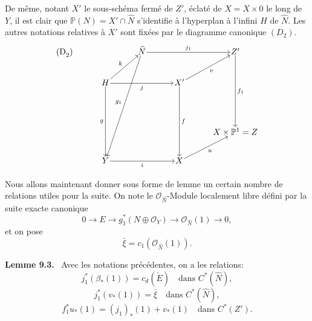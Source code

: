 \documentclass[11pt]{article}
\newenvironment{statement}[1]{\par\medskip\noindent\textbf{#1.}\ }{\par\medskip}
\begin{document}
De même, notant $X'$ le sous-schéma fermé de $Z'$, éclaté de $X=X\times0$ le long de $Y$, il est clair que $\mathbb P(N)=X'\cap\widehat N$ s'identifie à l'hyperplan à l'infini $H$ de $\widehat N$. Les autres notations relatives à $X'$ sont fixées par le diagramme canonique $(D_2)$.
\[
\begin{tikzcd}[column sep=3.2em,row sep=2.4em,cells={nodes={inner sep=1pt}}]
\text{(D}_2\text{)}\arrow[from=1-3,to=5-2,"g_1"']
& & \widehat N \arrow[rr,"j_1"] & & Z' \arrow[ddd,"f_1"] \\
& H \arrow[ur,"k"] \arrow[rr,"j"'] \arrow[ddd,"g"'] & &
X' \arrow[ur,"v"'] \arrow[ddd,"f"] & \\
& & & & \\
& & & & X\times\mathbb P^1=Z \\
& Y \arrow[rr,"i"'] & & X \arrow[ur,"u"'] &
\end{tikzcd}
\]

Nous allons maintenant donner sous forme de lemme un certain nombre de relations utiles pour la suite. On note le $\mathcal O_{\widehat N}$-Module localement libre défini par la suite exacte canonique
\[
0\to E\to g_1^*(N\oplus\mathcal O_Y)\to\mathcal O_{\widehat N}(1)\to0,
\tag{9.3.0}
\]
et on pose
\[
\bar\xi=c_1(\mathcal O_{\widehat N}(1)).
\tag{9.3.1}
\]

\begin{statement}{Lemme 9.3}
Avec les notations précédentes, on a les relations:
\[
j_1^*(\beta_*(1))=c_d(\check E)\quad\text{dans }C^*(\widehat N),
\tag{9.3.2}
\]
\[
j_1^*(v_*(1))=\bar\xi\quad\text{dans }C^*(\widehat N),
\tag{9.3.3}
\]
\[
f_1^*u_*(1)=(j_1)_*(1)+v_*(1)\quad\text{dans }C^*(Z').
\tag{9.3.4}
\]
\end{statement}
\end{document}
